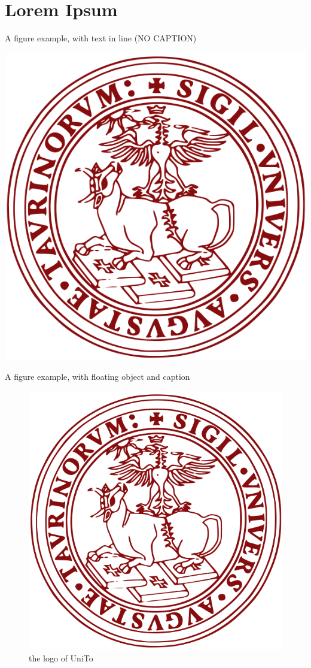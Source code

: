 \chapter[Chapter name for Index]{Lorem Ipsum}

A figure example, with text in line (NO CAPTION)
\begin{center}

\includegraphics[scale=0.15]{head/logo.png}


\end{center}

A figure example, with floating object and caption

\begin{figure}
\centering

\includegraphics[scale=0.15]{head/logo.png}
\caption{the logo of UniTo}

\end{figure}
